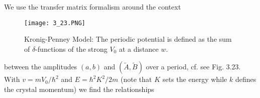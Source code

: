 We use the transfer matrix formalism around the context
\begin{figure}[ht]
    \begin{minipage}{0.5\textwidth}
        \centering
        \texttt{[image: 3\_23.PNG]}
    \end{minipage}
    \begin{minipage}{0.5\textwidth}
        \caption{Kronig-Penney Model: The periodic potential is defined as the sum of $\delta$-functions of the strong $V_0$ at a distance $w$.}
    \end{minipage}
\end{figure}
between the amplitudes $(a, b)$ and $(\tilde{A},\tilde{B})$ over a period, cf. see Fig. 3.23. With $v = mV_0 / \hbar^2$ and $E = \hbar^2K^2/2m$ (note that $K$ sets the energy while $k$ defines the crystal momentum) we find the relationships
